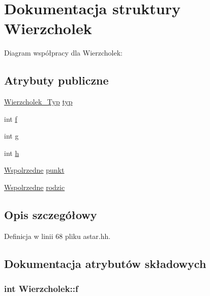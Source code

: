 \hypertarget{struct_wierzcholek}{\section{\-Dokumentacja struktury \-Wierzcholek}
\label{struct_wierzcholek}
}


\-Diagram współpracy dla \-Wierzcholek\-:
\subsection*{\-Atrybuty publiczne}
\begin{DoxyCompactItemize}
\item 
\hyperlink{astar_8hh_af54d448689b4613c3715929ca2a914a2}{\-Wierzcholek\-\_\-\-Typ} \hyperlink{struct_wierzcholek_ac812fe482bda5f924cf38d48340aa018}{typ}
\item 
int \hyperlink{struct_wierzcholek_a013cad942d610c41b4cbea903ff8d9a5}{f}
\item 
int \hyperlink{struct_wierzcholek_a040d7401732673a65daf8cdbdaa7e2c1}{g}
\item 
int \hyperlink{struct_wierzcholek_ac7bb6b2e9a5254904bc67b33b76d34e4}{h}
\item 
\hyperlink{struct_wspolrzedne}{\-Wspolrzedne} \hyperlink{struct_wierzcholek_adec40be68641a9c7b6ba1f70da808ba2}{punkt}
\item 
\hyperlink{struct_wspolrzedne}{\-Wspolrzedne} \hyperlink{struct_wierzcholek_a5333fedf15fe355de30763ff2be59eaf}{rodzic}
\end{DoxyCompactItemize}


\subsection{\-Opis szczegółowy}


\-Definicja w linii 68 pliku astar.\-hh.



\subsection{\-Dokumentacja atrybutów składowych}
\hypertarget{struct_wierzcholek_a013cad942d610c41b4cbea903ff8d9a5}{
\subsubsection[{f}]{\setlength{\rightskip}{0pt plus 5cm}int {\bf \-Wierzcholek\-::f}}}\label{struct_wierzcholek_a013cad942d610c41b4cbea903ff8d9a5}


